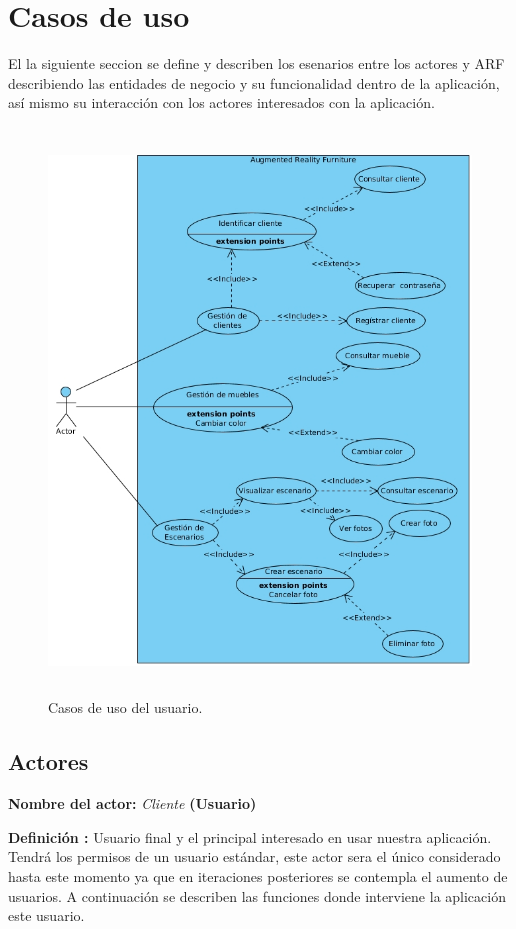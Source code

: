 \section{Casos de uso}
El la siguiente seccion se define y describen los esenarios entre los actores y ARF describiendo las entidades de negocio y su funcionalidad dentro de la aplicación, así mismo su interacción con los actores interesados con la aplicación.\par
\begin{figure}[h!]
	\centering
	\includegraphics[width=13cm,height=15cm]{imagenes/analisis/casosDeUso.jpg}
	\caption{Casos de uso del usuario.}
	\label{fig:analogo}
\end{figure}  
\newpage

\subsection{Actores}
\textbf{Nombre del actor:} \textit{Cliente} \textbf{(Usuario)}\par
\textbf{Definición :} Usuario final y el principal interesado en usar nuestra aplicación. Tendrá los permisos de un usuario estándar, este actor sera el único considerado hasta este momento ya que en iteraciones posteriores se contempla el aumento de usuarios. A continuación se describen las funciones donde interviene la aplicación este usuario.

